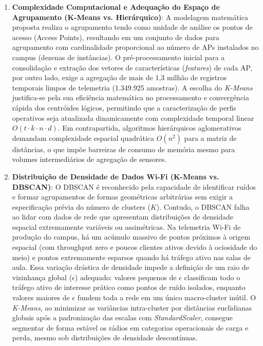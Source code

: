 \begin{enumerate}
    \item \textbf{Complexidade Computacional e Adequação do Espaço de Agrupamento (K-Means vs. Hierárquico)}: A modelagem matemática proposta realiza o agrupamento tendo como unidade de análise os pontos de acesso (Access Points), resultando em um conjunto de dados para agrupamento com cardinalidade proporcional ao número de APs instalados no campus (dezenas de instâncias). O pré-processamento inicial para a consolidação e extração dos vetores de características (\textit{features}) de cada AP, por outro lado, exige a agregação de mais de 1,3 milhão de registros temporais limpos de telemetria (1.349.925 amostras). A escolha do \textit{K-Means} justifica-se pela sua eficiência matemática no processamento e convergência rápida dos centróides lógicos, permitindo que a caracterização de perfis operativos seja atualizada dinamicamente com complexidade temporal linear $O(t \cdot k \cdot n \cdot d)$. Em contrapartida, algoritmos hierárquicos aglomerativos demandam complexidade espacial quadrática $O(n^2)$ para a matriz de distâncias, o que impõe barreiras de consumo de memória mesmo para volumes intermediários de agregação de sensores.
    
    \item \textbf{Distribuição de Densidade de Dados Wi-Fi (K-Means vs. DBSCAN)}: O DBSCAN é reconhecido pela capacidade de identificar ruídos e formar agrupamentos de formas geométricas arbitrárias sem exigir a especificação prévia do número de clusters ($K$). Contudo, o DBSCAN falha ao lidar com dados de rede que apresentam distribuições de densidade espacial extremamente variáveis ou assimétricas. Na telemetria Wi-Fi de produção do campus, há um acúmulo massivo de pontos próximos à origem espacial (com throughput zero e poucos clientes ativos devido à ociosidade do meio) e pontos extremamente esparsos quando há tráfego ativo nas salas de aula. Essa variação drástica de densidade impede a definição de um raio de vizinhança global ($\epsilon$) adequado: valores pequenos de $\epsilon$ classificam todo o tráfego ativo de interesse prático como pontos de ruído isolados, enquanto valores maiores de $\epsilon$ fundem toda a rede em um único macro-cluster inútil. O \textit{K-Means}, ao minimizar as variâncias intra-cluster por distâncias euclidianas globais após a padronização das escalas com \textit{StandardScaler}, consegue segmentar de forma estável os rádios em categorias operacionais de carga e perda, mesmo sob distribuições de densidade descontínuas.
\end{enumerate}

